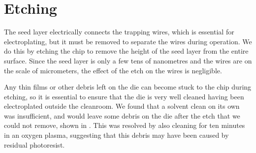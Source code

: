 \section{Etching}

The seed layer electrically connects the trapping wires, which is
essential for electroplating, but it must be removed to separate the wires
during operation. We do this by etching the chip to remove the height of the
seed layer from the entire surface. Since the seed layer is only a few tens of
nanometres and the wires are on the scale of micrometers, the effect of the
etch on the wires is negligible.

Any thin films or other debris left on the die can become stuck to the chip
during etching, so it is essential to ensure that the die is very well cleaned
having been electroplated outside the cleanroom.  We found that a solvent clean
on its own was insufficient, and would leave some debris on the die after the
etch that we could not remove, shown in . This was
resolved by also cleaning for ten minutes in an oxygen plasma, suggesting that
this debris may have been caused by residual photoresist.

